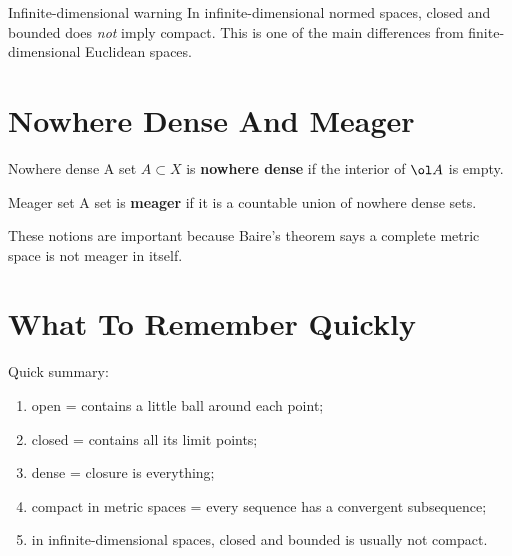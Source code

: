 \documentclass[header={Ancillary Note: Basic Topology},notheorems]{study-note}
\begin{document}
\begin{warningbox}{Infinite-dimensional warning}
In infinite-dimensional normed spaces, closed and bounded does \emph{not} imply compact. This is one of the main differences from finite-dimensional Euclidean spaces.
\end{warningbox}

\section{Nowhere Dense And Meager}

\begin{defbox}{Nowhere dense}
A set $A\subset X$ is \textbf{nowhere dense} if the interior of $\ol A$ is empty.
\end{defbox}

\begin{defbox}{Meager set}
A set is \textbf{meager} if it is a countable union of nowhere dense sets.
\end{defbox}

\begin{focusbox}
These notions are important because Baire's theorem says a complete metric space is not meager in itself.
\end{focusbox}

\section{What To Remember Quickly}

\begin{focusbox}
Quick summary:
\begin{enumerate}
\item open = contains a little ball around each point;
\item closed = contains all its limit points;
\item dense = closure is everything;
\item compact in metric spaces = every sequence has a convergent subsequence;
\item in infinite-dimensional spaces, closed and bounded is usually not compact.
\end{enumerate}
\end{focusbox}
\end{document}
